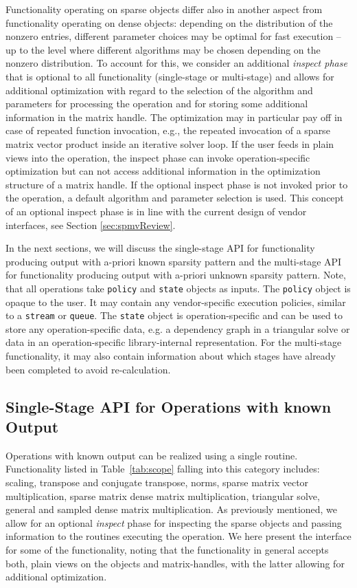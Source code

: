 \documentclass{article}
\begin{document}
Functionality operating on sparse objects differ also in another aspect from functionality operating on dense objects: depending on the distribution of the nonzero entries, different parameter choices may be optimal for fast execution -- up to the level where different algorithms may be chosen depending on the nonzero distribution. To account for this, we consider an additional \textit{inspect phase} that is optional to all functionality (single-stage or multi-stage) and allows for additional optimization with regard to the selection of the algorithm and parameters for processing the operation and for storing some additional information in the matrix handle. The optimization may in particular pay off in case of repeated function invocation, e.g., the repeated invocation of a sparse matrix vector product inside an iterative solver loop. If the user feeds in plain views into the operation, the inspect phase can invoke operation-specific optimization but can not access additional information in the optimization structure of a matrix handle.
If the optional inspect phase is not invoked prior to the operation, a default algorithm and parameter selection is used. 
This concept of an optional inspect phase is in line with the current design of vendor interfaces, see Section \ref{sec:spmvReview}.



In the next sections, we will discuss the single-stage API for functionality producing output with a-priori known sparsity pattern and the multi-stage API for functionality producing output with a-priori unknown sparsity pattern.
Note, that all operations take \texttt{policy} and \texttt{state} objects as inputs. The \texttt{policy} object is opaque to the user. It may contain any vendor-specific execution policies, similar to a \texttt{stream} or \texttt{queue}. The \texttt{state} object is operation-specific and can be used to store any operation-specific data, e.g. a dependency graph in a triangular solve or data in an operation-specific library-internal representation. For the multi-stage functionality, it may also contain information about which stages have already been completed to avoid re-calculation.

\subsection{Single-Stage API for Operations with known Output}
\label{sec:single-stage-api}

Operations with known output can be realized using a single routine. Functionality listed in Table~\ref{tab:scope} falling into this category includes: scaling, transpose and conjugate transpose, norms, sparse matrix vector multiplication, sparse matrix dense matrix multiplication, triangular solve, general and sampled dense matrix multiplication. As previously mentioned, we allow for an optional \textit{inspect} phase for inspecting the sparse objects and passing information to the routines executing the operation. We here present the interface for some of the functionality, noting that the functionality in general accepts both, plain views on the objects and matrix-handles, with the latter allowing for additional optimization.
\end{document}
